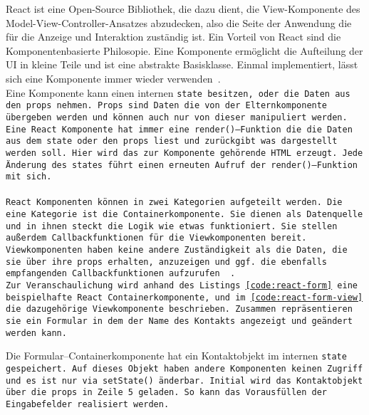 React ist eine Open-Source Bibliothek, die dazu dient, die View-Komponente des Model-View-Controller-Ansatzes abzudecken, also die Seite der Anwendung die für die Anzeige und Interaktion zuständig ist. Ein Vorteil von React sind die Komponentenbasierte Philosopie. Eine Komponente ermöglicht die Aufteilung der \gls{UI} in kleine Teile und ist eine abstrakte Basisklasse. Einmal implementiert, lässt sich eine Komponente immer wieder verwenden~\cite{react}.\\
Eine Komponente kann einen internen \tt{state} besitzen, oder die Daten aus den \tt{props} nehmen.
\tt{Props} sind Daten die von der Elternkomponente übergeben werden und können auch nur von dieser manipuliert werden.
Eine React Komponente hat immer eine \tt{render()}--Funktion die die Daten aus dem \tt{state} oder den \tt{props} liest und zurückgibt was dargestellt werden soll.
Hier wird das zur Komponente gehörende \gls{HTML} erzeugt. Jede Änderung des \tt{states} führt einen erneuten Aufruf der \tt{render()}--Funktion mit sich.\\\\
React Komponenten können in zwei Kategorien aufgeteilt werden. Die eine Kategorie ist die Containerkomponente. Sie dienen als Datenquelle und in ihnen steckt die Logik wie etwas funktioniert. Sie stellen außerdem Callbackfunktionen für die Viewkomponenten bereit.
Viewkomponenten haben keine andere Zuständigkeit als die Daten, die sie über ihre \tt{props} erhalten, anzuzeigen und ggf. die ebenfalls empfangenden Callbackfunktionen aufzurufen ~\cite{react-components}.\\
Zur Veranschaulichung wird anhand des Listings \ref{code:react-form} eine beispielhafte React Containerkomponente, und im \autoref{code:react-form-view} die dazugehörige Viewkomponente beschrieben.
Zusammen repräsentieren sie ein Formular in dem der Name des Kontakts angezeigt und geändert werden kann.
%
\begin{center}
  
\end{center}
%
Die Formular--Containerkomponente hat ein Kontaktobjekt im internen \tt{state} gespeichert.
Auf dieses Objekt haben andere Komponenten keinen Zugriff und es ist nur via \tt{setState()} änderbar.
Initial wird das Kontaktobjekt über die \tt{props} in Zeile 5 geladen. So kann das Vorausfüllen der Eingabefelder realisiert werden.\\
